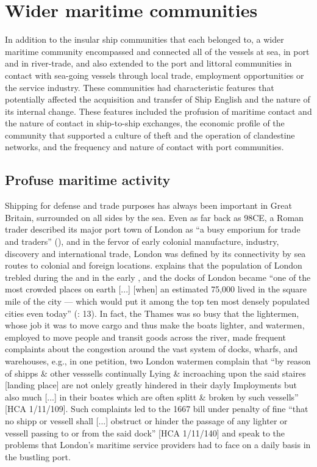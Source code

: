 \section{{Wider maritime communities}}\label{sec:4.3}

In addition to the insular ship communities that each  belonged to, a wider maritime community encompassed and connected all of the vessels at sea, in port and in river-trade, and also extended to the port and littoral communities in contact with sea-going vessels through local trade, employment opportunities or the service industry. These communities had characteristic features that potentially affected the acquisition and transfer of Ship English and the nature of its internal change. These features included the profusion of maritime contact and the nature of contact in ship-to-ship exchanges, the economic profile of the community that supported a culture of theft and the operation of clandestine networks, and the frequency and nature of contact with port communities. 

\subsection{{Profuse maritime activity}}\label{sec:4.3.1}

Shipping for defense and trade purposes has always been important in Great Britain, surrounded on all sides by the sea. Even as far back as 98CE, a Roman trader described its major port town of London as “a busy emporium for trade and traders” (\citealt{Tacitus1913}), and in the fervor of early colonial manufacture, industry, discovery and international trade, London was defined by its connectivity by sea routes to colonial and foreign locations. \citeauthor{Bicheno2012} explains that the population of London trebled during the  and in the early , and the docks of London became “one of the most crowded places on earth [...] [when] an estimated 75,000 lived in the square mile of the city — which would put it among the top ten most densely populated cities even today” (\citealt{Bicheno2012}: 13). In fact, the Thames was so busy that the lightermen, whose job it was to move cargo and thus make the boats lighter, and watermen, employed to move people and transit goods across the river, made frequent complaints about the congestion around the vast system of docks, wharfs, and warehouses, e.g., in one petition, two London watermen complain that “by reason of shipps \& other vesssells continually Lying \& incroaching upon the said staires [landing place] are not onlely greatly hindered in their dayly Imployments but also much  [...] in their boates which are often splitt \& broken by such vessells” [HCA 1/11/109].  Such complaints led to the 1667 bill under penalty of fine “that no shipp or vessell shall [...] obstruct or hinder the passage of any lighter or vessell passing to or from the said dock” [HCA 1/11/140] and speak to the problems that London’s maritime service providers had to face on a daily basis in the bustling port. 

